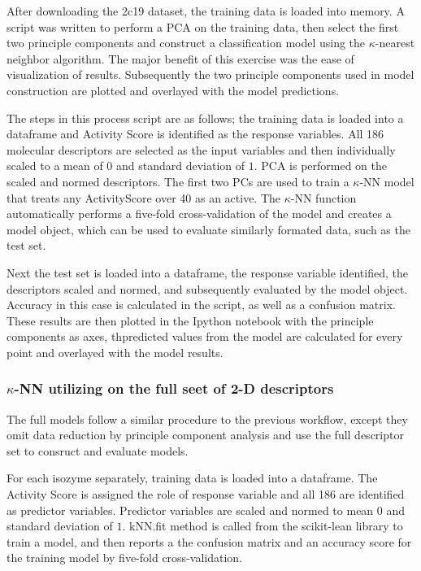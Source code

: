 After downloading the 2c19 dataset, the training data is loaded into memory. A script was written to perform a PCA on the training data, then select the first two principle components and construct a classification model using the $\kappa$-nearest neighbor algorithm. The major benefit of this exercise was the ease of visualization of results. Subsequently the two principle components used in model construction are plotted and overlayed with the model predictions.

The steps in this process script are as follows; the training data is loaded into a dataframe and Activity Score is identified as the response variables. All 186 molecular descriptors are selected as the input variables and then individually scaled to a mean of $0$ and standard deviation of $1$. PCA is performed on the scaled and normed descriptors. The first two PCs are used to train a $\kappa$-NN model that treats any ActivityScore over 40 as an active. The $\kappa$-NN function automatically performs a five-fold cross-validation of the model and creates a model object, which can be used to evaluate similarly formated data, such as the test set.

Next the test set is loaded into a dataframe, the response variable identified, the descriptors scaled and normed, and subsequently evaluated by the model object. Accuracy in this case is calculated in the script, as well as a confusion matrix. These results are then plotted in the Ipython notebook with the principle components as axes, thpredicted values from the model are calculated for every point and overlayed with the model results.

\subsubsection{$\kappa$-NN utilizing on the full seet of 2-D descriptors}
The full models follow a similar procedure to the previous workflow, except they omit data reduction by principle component analysis and use the full descriptor set to consruct and evaluate models. 

For each isozyme separately, training data is loaded into a dataframe. The Activity Score is assigned the role of response variable and all 186 are identified as predictor variables. Predictor variables are scaled and normed to mean $0$ and standard deviation of $1$. kNN.fit method is called from the scikit-lean library to train a model, and then reports a the confusion matrix and an accuracy score for the training model by five-fold cross-validation.

